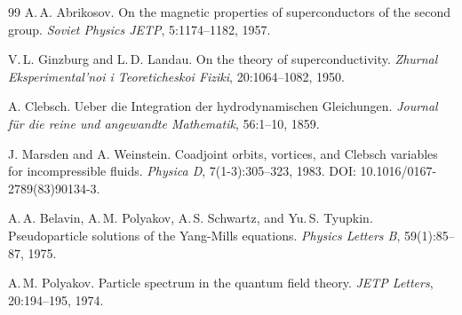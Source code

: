 \documentclass[11pt,a4paper]{article}
\begin{document}
\begin{thebibliography}{99}
		A.\,A. Abrikosov.
		\newblock On the magnetic properties of superconductors of the second group.
		\newblock \textit{Soviet Physics JETP}, 5:1174--1182, 1957.
		
		V.\,L. Ginzburg and L.\,D. Landau.
		\newblock On the theory of superconductivity.
		\newblock \textit{Zhurnal Eksperimental'noi i Teoreticheskoi Fiziki}, 20:1064--1082, 1950.
		
		A. Clebsch.
		\newblock Ueber die Integration der hydrodynamischen Gleichungen.
		\newblock \textit{Journal für die reine und angewandte Mathematik}, 56:1--10, 1859.
		
		J. Marsden and A. Weinstein.
		\newblock Coadjoint orbits, vortices, and Clebsch variables for incompressible fluids.
		\newblock \textit{Physica D}, 7(1-3):305--323, 1983.
		\newblock DOI: 10.1016/0167-2789(83)90134-3.
		
		A.\,A. Belavin, A.\,M. Polyakov, A.\,S. Schwartz, and Yu.\,S. Tyupkin.
		\newblock Pseudoparticle solutions of the Yang-Mills equations.
		\newblock \textit{Physics Letters B}, 59(1):85--87, 1975.
		
		A.\,M. Polyakov.
		\newblock Particle spectrum in the quantum field theory.
		\newblock \textit{JETP Letters}, 20:194--195, 1974.
		
	\end{thebibliography}
	
	
\end{document}
